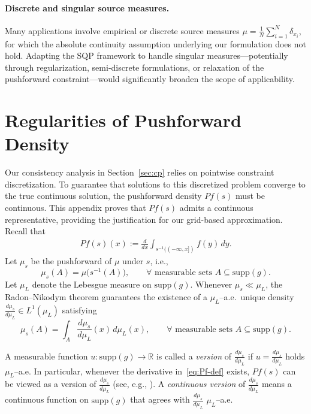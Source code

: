 \documentclass[12pt,leqno]{amsart}
\begin{document}
\paragraph{\bf Discrete and singular source measures.}
Many applications involve empirical or discrete source measures $\mu = \frac{1}{N}\sum_{i=1}^N \delta_{x_i}$, for which the absolute continuity assumption underlying our formulation does not hold. Adapting the SQP framework to handle singular measures---potentially through regularization, semi-discrete formulations, or relaxation of the pushforward constraint---would significantly broaden the scope of applicability.

\clearpage


\newpage
\appendix
\section{Regularities of Pushforward Density}\label{sec:pf-regularity}
Our consistency analysis in Section~\ref{sec:cp} relies on pointwise constraint discretization. To guarantee that solutions to this discretized problem converge to the true continuous solution, the pushforward density $Pf(s)$ must be continuous. This appendix proves that $Pf(s)$ admits a continuous representative, providing the justification for our grid-based approximation.
Recall that
\begin{align}
    Pf(s)(x) := \frac{d}{dx}\int_{s^{-1}((-\infty, x])} f(y)\,dy .
    \label{eq:Pf-def}
\end{align}
Let $\mu_s$ be the pushforward of $\mu$ under $s$, i.e.,
\[
\mu_s(A)=\mu\big(s^{-1}(A)\big), \qquad \forall\text{ measurable sets }  A\subseteq \mathrm{supp}(g).
\]
Let $\mu_L$ denote the Lebesgue measure on $\mathrm{supp}(g)$.
Whenever $\mu_s\ll \mu_L$, the Radon--Nikodym theorem guarantees the existence of
a $\mu_L$--a.e.\ unique density $\frac{d\mu_s}{d\mu_L}\in L^1(\mu_L)$ satisfying
\[
\mu_s(A)=\int_A \frac{d\mu_s}{d\mu_L}(x)\,d\mu_L(x),\qquad \forall\text{ measurable sets }  A\subseteq \mathrm{supp}(g).
\]

A measurable function $u:\mathrm{supp}(g)\to\mathbb R$ is called a \emph{version} of
$\frac{d\mu_s}{d\mu_L}$ if $u=\frac{d\mu_s}{d\mu_L}$ holds $\mu_L$--a.e.
In particular, whenever the derivative in~\eqref{eq:Pf-def} exists, $Pf(s)$ can be
viewed as a version of $\frac{d\mu_s}{d\mu_L}$ (see, e.g., \cite[Ch.\ 4]{boyarsky2012laws}).
A \emph{continuous version} of $\frac{d\mu_s}{d\mu_L}$ means a continuous function on
$\mathrm{supp}(g)$ that agrees with $\frac{d\mu_s}{d\mu_L}$ $\mu_L$--a.e.
\end{document}
